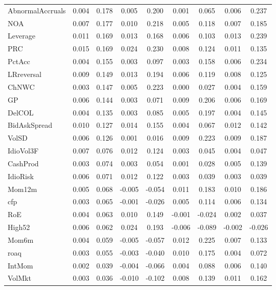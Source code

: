 \begin{table}[H]
\begin{tabular}{lcc|cc|cc|cc}
      AbnormalAccruals & 0.004 & 0.178 & 0.005 & 0.200 & 0.001 & 0.065 & 0.006 & 0.237 \\ 
      NOA & 0.007 & 0.177 & 0.010 & 0.218 & 0.005 & 0.118 & 0.007 & 0.185 \\ 
      Leverage & 0.011 & 0.169 & 0.013 & 0.168 & 0.006 & 0.103 & 0.013 & 0.239 \\ 
      PRC & 0.015 & 0.169 & 0.024 & 0.230 & 0.008 & 0.124 & 0.011 & 0.135 \\ 
      PctAcc & 0.004 & 0.155 & 0.003 & 0.097 & 0.003 & 0.158 & 0.006 & 0.234 \\ 
      LRreversal & 0.009 & 0.149 & 0.013 & 0.194 & 0.006 & 0.119 & 0.008 & 0.125 \\ 
      ChNWC & 0.003 & 0.147 & 0.005 & 0.223 & 0.000 & 0.027 & 0.004 & 0.159 \\ 
      GP & 0.006 & 0.144 & 0.003 & 0.071 & 0.009 & 0.206 & 0.006 & 0.169 \\ 
      DelCOL & 0.004 & 0.135 & 0.003 & 0.085 & 0.005 & 0.197 & 0.004 & 0.145 \\ 
      BidAskSpread & 0.010 & 0.127 & 0.014 & 0.155 & 0.004 & 0.067 & 0.012 & 0.142 \\ 
      VolSD & 0.006 & 0.126 & 0.001 & 0.016 & 0.009 & 0.223 & 0.009 & 0.187 \\ 
      IdioVol3F & 0.007 & 0.076 & 0.012 & 0.124 & 0.003 & 0.045 & 0.004 & 0.047 \\ 
      CashProd & 0.003 & 0.074 & 0.003 & 0.054 & 0.001 & 0.028 & 0.005 & 0.139 \\ 
      IdioRisk & 0.006 & 0.071 & 0.012 & 0.122 & 0.003 & 0.039 & 0.003 & 0.039 \\ 
      Mom12m & 0.005 & 0.068 & -0.005 & -0.054 & 0.011 & 0.183 & 0.010 & 0.186 \\ 
      cfp & 0.003 & 0.065 & -0.001 & -0.026 & 0.005 & 0.114 & 0.006 & 0.134 \\ 
      RoE & 0.004 & 0.063 & 0.010 & 0.149 & -0.001 & -0.024 & 0.002 & 0.037 \\ 
      High52 & 0.006 & 0.062 & 0.024 & 0.193 & -0.006 & -0.089 & -0.002 & -0.026 \\ 
      Mom6m & 0.004 & 0.059 & -0.005 & -0.057 & 0.012 & 0.225 & 0.007 & 0.133 \\ 
      roaq & 0.003 & 0.055 & -0.003 & -0.040 & 0.010 & 0.175 & 0.004 & 0.072 \\ 
      IntMom & 0.002 & 0.039 & -0.004 & -0.066 & 0.004 & 0.088 & 0.006 & 0.140 \\ 
      VolMkt & 0.003 & 0.036 & -0.010 & -0.102 & 0.008 & 0.139 & 0.011 & 0.162 \\ 

\end{tabular}
\end{table}

